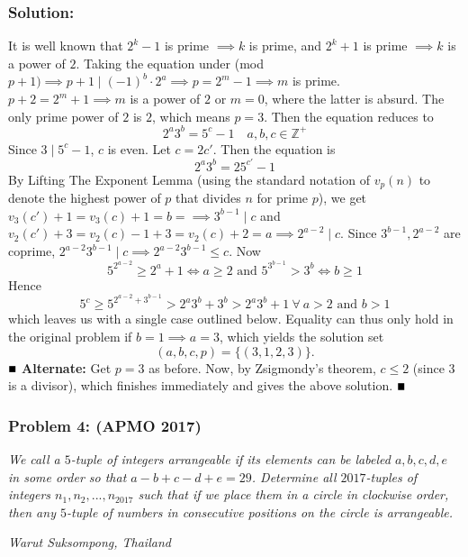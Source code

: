 \documentclass[fontsize=10pt]{article}
\begin{document}
\subsubsection*{Solution:}
    It is well known that $2^k - 1$ is prime $\implies k$ is prime, and $2^k+1$ is prime $\implies k$ is a power of $2$. \newline
    Taking the equation under (mod $p+1) \implies p+1 \mid (-1)^b \cdot 2^a\implies p = 2^m - 1 \implies m$ is prime. 
    $p+2 = 2^m+1 \implies m$ is a power of $2$ or $m=0$, where the latter is absurd.
    The only prime power of $2$ is $2$, which means $p = 3$. 
    Then the equation reduces to \[2^a3^b = 5^c-1 \quad a,b,c\in \mathbb{Z}^+\]
    Since $3 \mid 5^c-1$, $c$ is even. Let $c=2c'$. Then the equation is \[2^a3^b=25^{c'}-1\] By
    Lifting The Exponent Lemma (using the standard notation of $v_p(n)$ 
    to denote the highest power of $p$ that divides $n$ for prime $p$), 
    we get $v_3(c')+1=v_3(c)+1=b =\implies 3^{b-1} \mid c$ and $v_2(c') +3= v_2(c)-1 + 3 = v_2(c)+2=a \implies 2^{a-2} \mid c$.
    Since $3^{b-1}, 2^{a-2}$ are coprime, $2^{a-2}3^{b-1} \mid c \implies 2^{a-2}3^{b-1} \le c$. \newline 
    Now \[ 5^{2^{a-2}} \ge 2^a+1 \iff a \ge 2 \text{ and } 5^{3^{b-1}} > 3^b \iff b \ge 1\]
    Hence \[5^c \ge 5^{2^{a-2}+ 3^{b-1}} > 2^a3^b + 3^b > 2^a3^b+1  \ \forall \ a>2 \text{ and } b>1\] 
    which leaves us with a single case outlined below. \newline
    Equality can thus only hold in the original problem 
    if $b=1 \implies a=3$, which yields the solution set \[(a,b,c,p) = \{(3, 1, 2, 3) \}. \] $\hfill \blacksquare$ 
    \newline
    \textbf{Alternate:} Get $p=3$ as before. Now, by Zsigmondy's theorem, $c \le 2$ (since $3$ is a divisor), which finishes immediately
     and gives the above solution. $\hfill \blacksquare$

\subsubsection*{Problem 4: (APMO 2017)}
\textit{
	We call a $5$-tuple of integers \emph{arrangeable} if its elements can be labeled $a, b, c, d, e$ 
    in some order so that $a-b+c-d+e=29$. Determine all $2017$-tuples of integers $n_1, n_2, . . . , n_{2017}$ 
    such that if we place them in a circle in clockwise order, then any $5$-tuple of numbers in consecutive positions 
    on the circle is \emph{arrangeable}. }
\begin{flushright}
    \emph{Warut Suksompong, Thailand}
\end{flushright}
\end{document}
